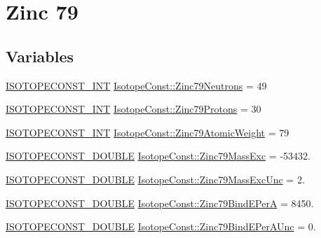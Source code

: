 \hypertarget{group___isotope_const-_zinc-_zn79}{}\section{Zinc 79}
\label{group___isotope_const-_zinc-_zn79}
\subsection*{Variables}
\begin{DoxyCompactItemize}
\item 
\mbox{\hyperlink{group___isotope_const-_macros_ga5f18360b3e99483a35c32d789e62621c}{I\+S\+O\+T\+O\+P\+E\+C\+O\+N\+S\+T\+\_\+\+I\+NT}} \mbox{\hyperlink{group___isotope_const-_zinc-_zn79_ga44571aa1445eb24075deee6eedef46b2}{Isotope\+Const\+::\+Zinc79\+Neutrons}} = 49
\item 
\mbox{\hyperlink{group___isotope_const-_macros_ga5f18360b3e99483a35c32d789e62621c}{I\+S\+O\+T\+O\+P\+E\+C\+O\+N\+S\+T\+\_\+\+I\+NT}} \mbox{\hyperlink{group___isotope_const-_zinc-_zn79_gacbcfb3e308e37f5646d04c94c1b74ab5}{Isotope\+Const\+::\+Zinc79\+Protons}} = 30
\item 
\mbox{\hyperlink{group___isotope_const-_macros_ga5f18360b3e99483a35c32d789e62621c}{I\+S\+O\+T\+O\+P\+E\+C\+O\+N\+S\+T\+\_\+\+I\+NT}} \mbox{\hyperlink{group___isotope_const-_zinc-_zn79_gafe10a195c53a1ab44b3908d200f9b279}{Isotope\+Const\+::\+Zinc79\+Atomic\+Weight}} = 79
\item 
\mbox{\hyperlink{group___isotope_const-_macros_ga8f45a7272ce02c0b4c65c44636ed719a}{I\+S\+O\+T\+O\+P\+E\+C\+O\+N\+S\+T\+\_\+\+D\+O\+U\+B\+LE}} \mbox{\hyperlink{group___isotope_const-_zinc-_zn79_ga1af86ecbc0d2c5d8ce7807979b311268}{Isotope\+Const\+::\+Zinc79\+Mass\+Exc}} = -\/53432.
\item 
\mbox{\hyperlink{group___isotope_const-_macros_ga8f45a7272ce02c0b4c65c44636ed719a}{I\+S\+O\+T\+O\+P\+E\+C\+O\+N\+S\+T\+\_\+\+D\+O\+U\+B\+LE}} \mbox{\hyperlink{group___isotope_const-_zinc-_zn79_gad851a6e324627ad526f889f76e079904}{Isotope\+Const\+::\+Zinc79\+Mass\+Exc\+Unc}} = 2.
\item 
\mbox{\hyperlink{group___isotope_const-_macros_ga8f45a7272ce02c0b4c65c44636ed719a}{I\+S\+O\+T\+O\+P\+E\+C\+O\+N\+S\+T\+\_\+\+D\+O\+U\+B\+LE}} \mbox{\hyperlink{group___isotope_const-_zinc-_zn79_ga94c470b70a18ec5480f3142d9d7170df}{Isotope\+Const\+::\+Zinc79\+Bind\+E\+PerA}} = 8450.
\item 
\mbox{\hyperlink{group___isotope_const-_macros_ga8f45a7272ce02c0b4c65c44636ed719a}{I\+S\+O\+T\+O\+P\+E\+C\+O\+N\+S\+T\+\_\+\+D\+O\+U\+B\+LE}} \mbox{\hyperlink{group___isotope_const-_zinc-_zn79_gad7fa8d50a3af2ce418696839403695e9}{Isotope\+Const\+::\+Zinc79\+Bind\+E\+Per\+A\+Unc}} = 0.

\end{DoxyCompactItemize}
